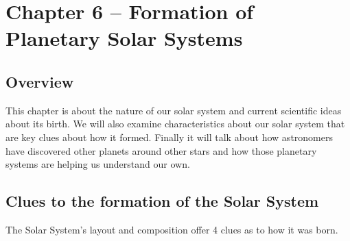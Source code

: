 \section{Chapter 6 -- Formation of Planetary Solar Systems}
\subsection{Overview}
This chapter is about the nature of our solar system and current scientific ideas about its birth. We will also examine characteristics about our solar system that are key clues about how it formed. Finally it will talk about how astronomers have discovered other planets around other stars and how those planetary systems are helping us understand our own.

\subsection{Clues to the formation of the Solar System}
The Solar System's layout and composition offer 4 clues as to how it was born.
